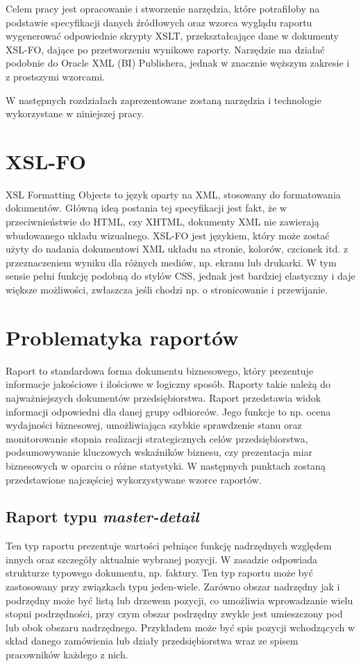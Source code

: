 \documentclass[11pt,a4paper]{article}
\begin{document}
Celem pracy jest opracowanie i stworzenie narzędzia, które potrafiłoby na podstawie specyfikacji danych źródłowych oraz wzorca wyglądu raportu wygenerować odpowiednie skrypty XSLT, przekształcające dane w dokumenty XSL-FO, dające po przetworzeniu wynikowe raporty. Narzędzie ma działać podobnie do Oracle XML (BI) Publishera, jednak w znacznie węższym zakresie i z prostszymi wzorcami.

W następnych rozdziałach zaprezentowane zostaną narzędzia i technologie wykorzystane w niniejszej pracy.


\section{XSL-FO} \label{sec:xslfo}
XSL Formatting Objects to język oparty na XML, stosowany do formatowania dokumentów. Główną ideą postania tej specyfikacji jest fakt, że w przeciwnieństwie do HTML, czy XHTML, dokumenty XML nie zawierają wbudowanego układu wizualnego. XSL-FO jest językiem, który może zostać użyty do nadania dokumentowi XML układu na stronie, kolorów, czcionek itd. z przeznaczeniem wyniku dla różnych mediów, np. ekranu lub drukarki. W tym sensie pełni funkcję podobną do stylów CSS, jednak jest bardziej elastyczny i daje większe możliwości, zwłaszcza jeśli chodzi np. o stronicowanie i przewijanie.

\section{Problematyka raportów}\label{sec:raport}
Raport to standardowa forma dokumentu biznesowego, który prezentuje informacje jakościowe i ilościowe w logiczny sposób. Raporty takie należą do najważniejszych dokumentów przedsiębiorstwa. Raport przedstawia widok informacji odpowiedni dla danej grupy odbiorców. Jego funkcje to np.
ocena wydajności biznesowej, umożliwiająca szybkie sprawdzenie stanu oraz monitorowanie stopnia realizacji strategicznych celów przedsiębiorstwa, podsumowywanie kluczowych wskaźników biznesu, czy prezentacja miar biznesowych w oparciu o różne statystyki. W następnych punktach zostaną przedstawione najczęściej wykorzystywane wzorce raportów.
\subsection{Raport typu \emph{master-detail}}\label{sec:master_detail}
Ten typ raportu prezentuje wartości pełniące funkcję nadrzędnych względem innych oraz szczegóły aktualnie wybranej pozycji. W zasadzie odpowiada strukturze typowego dokumentu, np. faktury. Ten typ raportu może być zastosowany przy związkach typu jeden-wiele. Zarówno obszar nadrzędny jak i podrzędny może być listą lub drzewem pozycji, co umożliwia wprowadzanie wielu stopni podrzędności, przy czym obszar podrzędny zwykle jest umieszczony pod lub obok obszaru nadrzędnego. Przykładem może być spis pozycji wchodzących w skład danego zamówienia lub działy przedsiębiorstwa wraz ze spisem pracowników każdego z nich.
\end{document}
